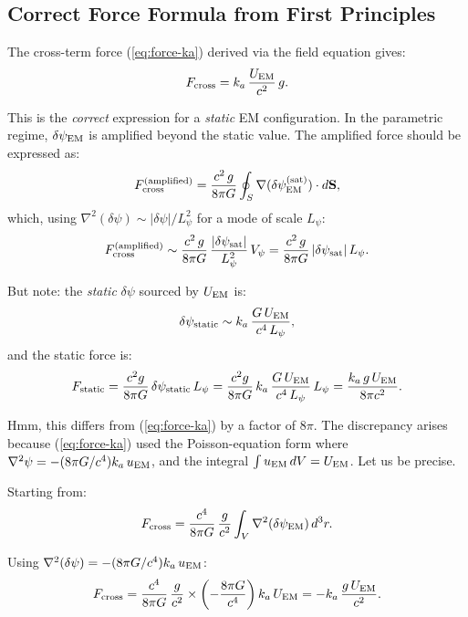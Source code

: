 \documentclass[11pt]{article}
\newcommand{\ka}{k_a}
\begin{document}
\subsection{Correct Force Formula from First Principles}

The cross-term force (\ref{eq:force-ka}) derived via the field equation
gives:
\begin{equation}
F_{\rm cross} = \ka\,\frac{U_{\rm EM}}{c^2}\,g.
\end{equation}

This is the \textit{correct} expression for a \textit{static} EM configuration.
In the parametric regime, $\delta\psi_{\rm EM}$ is amplified beyond the
static value. The amplified force should be expressed as:
\begin{equation}
F_{\rm cross}^{(\rm amplified)}
  = \frac{c^2\,g}{8\pi G}\oint_S
    \nabla(\delta\psi_{\rm EM}^{(\rm sat)})\cdot d\mathbf{S},
\end{equation}
which, using $\nabla^2(\delta\psi) \sim |\delta\psi|/L_\psi^2$ for a
mode of scale $L_\psi$:
\begin{equation}
F_{\rm cross}^{(\rm amplified)}
  \sim \frac{c^2\,g}{8\pi G}\,\frac{|\delta\psi_{\rm sat}|}{L_\psi^2}\,V_\psi
  = \frac{c^2\,g}{8\pi G}\,|\delta\psi_{\rm sat}|\,L_\psi.
\end{equation}

But note: the \textit{static} $\delta\psi$ sourced by $U_{\rm EM}$ is:
\begin{equation}
\delta\psi_{\rm static} \sim \ka\,\frac{G\,U_{\rm EM}}{c^4\,L_\psi},
\end{equation}
and the static force is:
\begin{equation}
F_{\rm static} = \frac{c^2 g}{8\pi G}\,\delta\psi_{\rm static}\,L_\psi
  = \frac{c^2 g}{8\pi G}\,\ka\,\frac{G\,U_{\rm EM}}{c^4\,L_\psi}\,L_\psi
  = \frac{\ka\,g\,U_{\rm EM}}{8\pi c^2}.
\end{equation}

Hmm, this differs from (\ref{eq:force-ka}) by a factor of $8\pi$.
The discrepancy arises because (\ref{eq:force-ka}) used the
Poisson-equation form where $\nabla^2\psi = -(8\pi G/c^4)\ka\,u_{\rm EM}$,
and the integral $\int u_{\rm EM}\,dV = U_{\rm EM}$. Let us be precise.

Starting from:
\begin{equation}
F_{\rm cross} = \frac{c^4}{8\pi G}\,\frac{g}{c^2}
  \int_V \nabla^2(\delta\psi_{\rm EM})\,d^3r.
\end{equation}

Using $\nabla^2(\delta\psi) = -(8\pi G/c^4)\ka\,u_{\rm EM}$:
\begin{equation}
F_{\rm cross} = \frac{c^4}{8\pi G}\,\frac{g}{c^2}
  \times\left(-\frac{8\pi G}{c^4}\right)\ka\,U_{\rm EM}
  = -\ka\,\frac{g\,U_{\rm EM}}{c^2}.
\end{equation}
\end{document}
